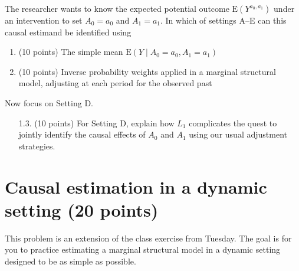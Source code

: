 \documentclass[10pt]{article}
\newcommand{\E}{\textrm{E}}
\begin{document}

The researcher wants to know the expected potential outcome $\E(Y^{a_0,a_1})$ under an intervention to set $A_0 = a_0$ and $A_1 = a_1$. In which of settings A--E can this causal estimand be identified using
\begin{enumerate}
    \item (10 points) The simple mean $\E(Y\mid A_0 = a_0, A_1 = a_1)$
    \item (10 points) Inverse probability weights applied in a marginal structural model, adjusting at each period for the observed past
\end{enumerate}

Now focus on Setting D.
\begin{enumerate}
    \item[1.3.] (10 points) For Setting D, explain how $L_1$ complicates the quest to jointly identify the causal effects of $A_0$ and $A_1$ using our usual adjustment strategies.
\end{enumerate}

\section{Causal estimation in a dynamic setting (20 points)}

This problem is an extension of the class exercise from Tuesday. The goal is for you to practice estimating a marginal structural model in a dynamic setting designed to be as simple as possible.
\end{document}
